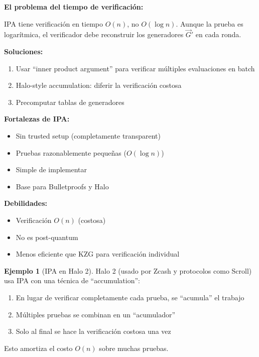 \documentclass[11pt,a4paper,twoside,openright]{book}
\theoremstyle{definition}
\newtheorem{example}{Ejemplo}[chapter]
\theoremstyle{plain}
\theoremstyle{remark}
\begin{document}
\begin{advertencia}
\textbf{El problema del tiempo de verificación:}

IPA tiene verificación en tiempo $O(n)$, no $O(\log n)$. Aunque la prueba es logarítmica, el verificador debe reconstruir los generadores $\vec{G}'$ en cada ronda.

\textbf{Soluciones:}
\begin{enumerate}
    \item Usar ``inner product argument'' para verificar múltiples evaluaciones en batch
    \item Halo-style accumulation: diferir la verificación costosa
    \item Precomputar tablas de generadores
\end{enumerate}
\end{advertencia}

\begin{keyidea}
\textbf{Fortalezas de IPA:}
\begin{itemize}
    \item Sin trusted setup (completamente transparent)
    \item Pruebas razonablemente pequeñas ($O(\log n)$)
    \item Simple de implementar
    \item Base para Bulletproofs y Halo
\end{itemize}

\textbf{Debilidades:}
\begin{itemize}
    \item Verificación $O(n)$ (costosa)
    \item No es post-quantum
    \item Menos eficiente que KZG para verificación individual
\end{itemize}
\end{keyidea}

\begin{example}[IPA en Halo 2]
Halo 2 (usado por Zcash y protocolos como Scroll) usa IPA con una técnica de ``accumulation'':

\begin{enumerate}
    \item En lugar de verificar completamente cada prueba, se ``acumula'' el trabajo
    \item Múltiples pruebas se combinan en un ``acumulador''
    \item Solo al final se hace la verificación costosa una vez
\end{enumerate}

Esto amortiza el costo $O(n)$ sobre muchas pruebas.
\end{example}
\end{document}
